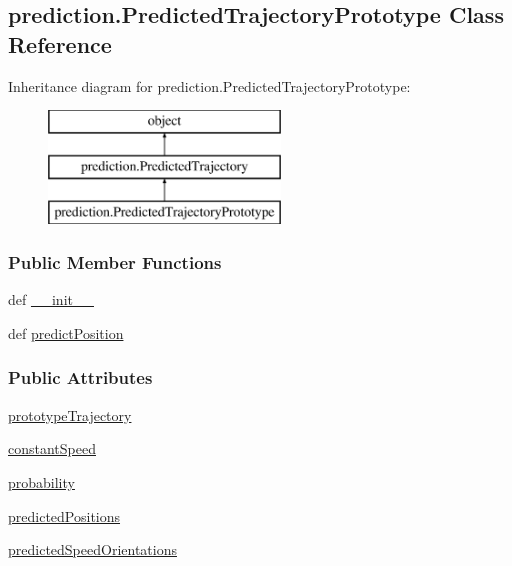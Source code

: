 \hypertarget{classprediction_1_1PredictedTrajectoryPrototype}{\subsection{prediction.\-Predicted\-Trajectory\-Prototype Class Reference}
\label{classprediction_1_1PredictedTrajectoryPrototype}
}
Inheritance diagram for prediction.\-Predicted\-Trajectory\-Prototype\-:\begin{figure}[H]
\begin{center}
\leavevmode
\includegraphics[height=3.000000cm]{classprediction_1_1PredictedTrajectoryPrototype}
\end{center}
\end{figure}
\subsubsection*{Public Member Functions}
\begin{DoxyCompactItemize}
\item 
def \hyperlink{classprediction_1_1PredictedTrajectoryPrototype_ab687233eeac4f24c106086e26b137c94}{\-\_\-\-\_\-init\-\_\-\-\_\-}
\item 
def \hyperlink{classprediction_1_1PredictedTrajectoryPrototype_a0282a109816f59e7548efa08d001d74e}{predict\-Position}
\end{DoxyCompactItemize}
\subsubsection*{Public Attributes}
\begin{DoxyCompactItemize}
\item 
\hyperlink{classprediction_1_1PredictedTrajectoryPrototype_aa7ffee6d30ebbcafe7134c36c6a24d37}{prototype\-Trajectory}
\item 
\hyperlink{classprediction_1_1PredictedTrajectoryPrototype_ac3f37f392469e617f2df0ef190568f9f}{constant\-Speed}
\item 
\hyperlink{classprediction_1_1PredictedTrajectoryPrototype_ae4e01bfd1c77add2c0c7a644f9042fe9}{probability}
\item 
\hyperlink{classprediction_1_1PredictedTrajectoryPrototype_a2626d54e11c5dffd00ea8785c6bb4c81}{predicted\-Positions}
\item 
\hyperlink{classprediction_1_1PredictedTrajectoryPrototype_a57df342a90c6252e7d8f9d986d3001a9}{predicted\-Speed\-Orientations}
\end{DoxyCompactItemize}



